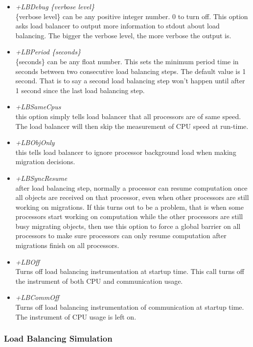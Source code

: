 \begin{enumerate}
\begin{itemize}
\item {\em +LBDebug \{verbose level\}} \\
     \{verbose level\} can be any positive integer number. 0 to turn off. 
     This option asks load balancer to output more information to stdout 
about load balancing. The bigger the verbose level, the more verbose the output is.
\item {\em +LBPeriod \{seconds\}} \\
     \{seconds\} can be any float number. This sets the minimum period time in 
seconds between two consecutive load balancing steps. The default value is 
1 second. That is to say a second load balancing step won't happen until
after 1 second since the last load balancing step.
\item {\em +LBSameCpus} \\
     this option simply tells load balancer that all processors are of same speed. The load balancer will then skip the measurement of CPU speed at run-time.
\item {\em +LBObjOnly} \\
     this tells load balancer to ignore processor background load when making migration decisions.
\item {\em +LBSyncResume} \\
     after load balancing step, normally a processor can resume computation 
once all objects are received on that processor, even when other processors
are still working on migrations.  If this turns out to be a problem, 
that is when some processors start working on computation while the other 
processors are still busy migrating objects, then use this option to force 
a global barrier on all processors to make sure processors can only resume 
computation after migrations finish on all processors.
\item {\em +LBOff} \\
     Turns off load balancing instrumentation at startup time. This call turns
off the instrument of both CPU and communication usage.
\item {\em +LBCommOff} \\
     Turns off load balancing instrumentation of communication at startup time. 
The instrument of CPU usage is left on.
\end{itemize}

\end{enumerate}

\subsubsection{Load Balancing Simulation}

